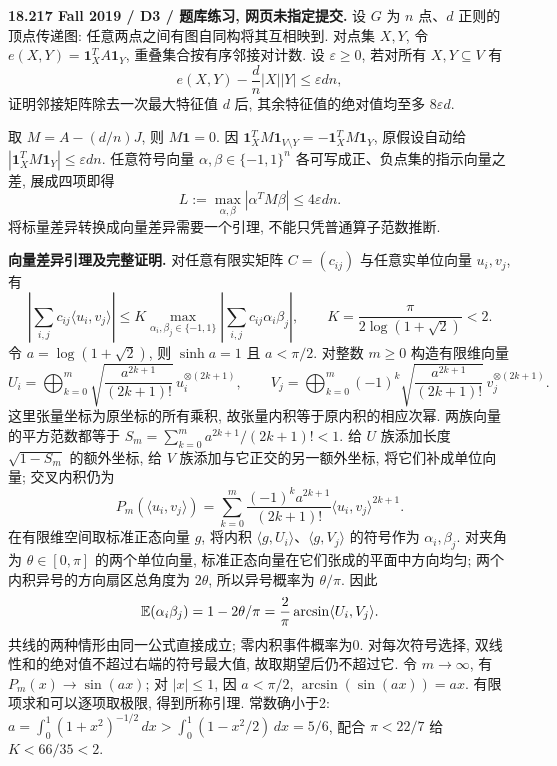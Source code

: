 \begin{exercise}\label{mit:18217-d3}
\textbf{18.217 Fall 2019 / D3 / 题库练习, 网页未指定提交.}
设 $G$ 为 $n$ 点、$d$ 正则的顶点传递图: 任意两点之间有图自同构将其互相映到. 对点集 $X,Y$, 令 $e(X,Y)=\mathbf1_X^TA\mathbf1_Y$, 重叠集合按有序邻接对计数. 设 $\varepsilon\ge0$, 若对所有 $X,Y\subseteq V$ 有
\[
e(X,Y)-\frac d n|X||Y|\le\varepsilon dn,
\]
证明邻接矩阵除去一次最大特征值 $d$ 后, 其余特征值的绝对值均至多 $8\varepsilon d$.
\end{exercise}
\begin{solution}
取 $M=A-(d/n)J$, 则 $M\mathbf1=0$. 因
$\mathbf1_X^TM\mathbf1_{V\setminus Y}=-\mathbf1_X^TM\mathbf1_Y$, 原假设自动给
$|\mathbf1_X^TM\mathbf1_Y|\le\varepsilon dn$.
任意符号向量 $\alpha,\beta\in\{-1,1\}^n$ 各可写成正、负点集的指示向量之差, 展成四项即得
\[
L:=\max_{\alpha,\beta}|\alpha^TM\beta|\le4\varepsilon dn.
\]
将标量差异转换成向量差异需要一个引理, 不能只凭普通算子范数推断.

\textbf{向量差异引理及完整证明.}
对任意有限实矩阵 $C=(c_{ij})$ 与任意实单位向量 $u_i,v_j$, 有
\[
\left|\sum_{i,j}c_{ij}\langle u_i,v_j\rangle\right|
\le K\max_{\alpha_i,\beta_j\in\{-1,1\}}
\left|\sum_{i,j}c_{ij}\alpha_i\beta_j\right|,
\qquad K=\frac{\pi}{2\log(1+\sqrt2)}<2.
\]
令 $a=\log(1+\sqrt2)$, 则 $\sinh a=1$ 且 $a<\pi/2$. 对整数 $m\ge0$ 构造有限维向量
\[
U_i=\bigoplus_{k=0}^m\sqrt{\frac{a^{2k+1}}{(2k+1)!}}\,u_i^{\otimes(2k+1)},
\qquad
V_j=\bigoplus_{k=0}^m(-1)^k\sqrt{\frac{a^{2k+1}}{(2k+1)!}}\,v_j^{\otimes(2k+1)}.
\]
这里张量坐标为原坐标的所有乘积, 故张量内积等于原内积的相应次幂. 两族向量的平方范数都等于
$S_m=\sum_{k=0}^m a^{2k+1}/(2k+1)!<1$.
给 $U$ 族添加长度 $\sqrt{1-S_m}$ 的额外坐标, 给 $V$ 族添加与它正交的另一额外坐标, 将它们补成单位向量; 交叉内积仍为
\[
P_m(\langle u_i,v_j\rangle)
=\sum_{k=0}^m\frac{(-1)^ka^{2k+1}}{(2k+1)!}
 \langle u_i,v_j\rangle^{2k+1}.
\]
在有限维空间取标准正态向量 $g$, 将内积 $\langle g,U_i\rangle$、$\langle g,V_j\rangle$ 的符号作为 $\alpha_i,\beta_j$. 对夹角为 $\theta\in[0,\pi]$ 的两个单位向量, 标准正态向量在它们张成的平面中方向均匀; 两个内积异号的方向扇区总角度为 $2\theta$, 所以异号概率为 $\theta/\pi$. 因此
\[
\mathbb E(\alpha_i\beta_j)=1-2\theta/\pi
=\frac2\pi\arcsin\langle U_i,V_j\rangle.
\]
共线的两种情形由同一公式直接成立; 零内积事件概率为0. 对每次符号选择, 双线性和的绝对值不超过右端的符号最大值, 故取期望后仍不超过它. 令 $m\to\infty$, 有 $P_m(x)\to\sin(ax)$; 对 $|x|\le1$, 因 $a<\pi/2$, $\arcsin(\sin(ax))=ax$. 有限项求和可以逐项取极限, 得到所称引理. 常数确小于2: $a=\int_0^1(1+x^2)^{-1/2}\,dx>\int_0^1(1-x^2/2)\,dx=5/6$, 配合 $\pi<22/7$ 给 $K<66/35<2$.


\end{solution}
